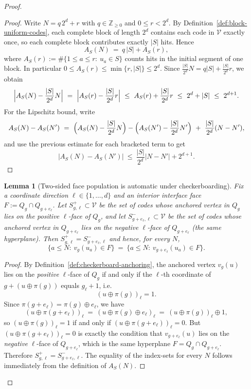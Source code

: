 \documentclass[11pt]{article}
\numberwithin{equation}{section}  %
\theoremstyle{plain}
\newtheorem{lemma}[theorem]{Lemma}
\theoremstyle{definition}
\theoremstyle{remark}
\newcommand{\Z}{\mathbb{Z}}
\begin{document}
\begin{proof}
\begin{proof}
Write $N=q\,2^d+r$ with $q\in\Z_{\ge 0}$ and $0\le r<2^d$.  By Definition~\ref{def:block-uniform-codes}, each complete block of
length $2^d$ contains each code in $\mathcal V$ exactly once, so each complete block contributes exactly $|S|$ hits.  Hence
\[
A_S(N)\ =\ q\,|S| + A_S(r),
\]
where $A_S(r):=\#\{1\le a\le r:\ u_a\in S\}$ counts hits in the initial segment of one block.  In particular
$0\le A_S(r)\le \min\{r,|S|\}\le 2^d$.
Since $\frac{|S|}{2^d}N=q|S|+\frac{|S|}{2^d}r$, we obtain
\[
\Bigl|A_S(N)-\frac{|S|}{2^d}N\Bigr|
\ =\ \Bigl|A_S(r)-\frac{|S|}{2^d}r\Bigr|
\ \le\ A_S(r)+\frac{|S|}{2^d}r
\ \le\ 2^d+|S|
\ \le\ 2^{d+1}.
\]
For the Lipschitz bound, write
\[
A_S(N)-A_S(N')\ =\ \Bigl(A_S(N)-\frac{|S|}{2^d}N\Bigr) - \Bigl(A_S(N')-\frac{|S|}{2^d}N'\Bigr)
\ +\ \frac{|S|}{2^d}(N-N'),
\]
and use the previous estimate for each bracketed term to get
\[
|A_S(N)-A_S(N')|
\ \le\ \frac{|S|}{2^d}|N-N'| + 2^{d+1}.
\]
\end{proof}


\begin{lemma}[Two-sided face population is automatic under checkerboarding]\label{lem:two-sided-face-pop}
Fix a coordinate direction $\ell\in\{1,\dots,d\}$ and an interior interface face $F:=Q_g\cap Q_{g+e_\ell}$.
Let $S_{g,\ell}^+\subset\mathcal V$ be the set of codes whose anchored vertex in $Q_g$ lies on the positive $\ell$-face of $Q_g$, and let
$S_{g+e_\ell,\ell}^-\subset\mathcal V$ be the set of codes whose anchored vertex in $Q_{g+e_\ell}$ lies on the negative $\ell$-face of $Q_{g+e_\ell}$ (the same hyperplane).
Then $S_{g,\ell}^+=S_{g+e_\ell,\ell}^-$ and hence, for every $N$,
\[
\{a\le N:\ v_g(u_a)\in F\}\ =\ \{a\le N:\ v_{g+e_\ell}(u_a)\in F\}.
\]
\end{lemma}

\begin{proof}
By Definition~\ref{def:checkerboard-anchoring}, the anchored vertex $v_g(u)$ lies on the \emph{positive} $\ell$-face of $Q_g$
if and only if the $\ell$-th coordinate of $g+(u\oplus\pi(g))$ equals $g_\ell+1$, i.e.
\[
(u\oplus\pi(g))_\ell=1.
\]
Since $\pi(g+e_\ell)=\pi(g)\oplus e_\ell$, we have
\[
(u\oplus\pi(g+e_\ell))_\ell \ =\ (u\oplus\pi(g)\oplus e_\ell)_\ell \ =\ (u\oplus\pi(g))_\ell\oplus 1,
\]
so $(u\oplus\pi(g))_\ell=1$ if and only if $(u\oplus\pi(g+e_\ell))_\ell=0$.
But $(u\oplus\pi(g+e_\ell))_\ell=0$ is exactly the condition that $v_{g+e_\ell}(u)$ lies on the \emph{negative} $\ell$-face
of $Q_{g+e_\ell}$, which is the same hyperplane $F=Q_g\cap Q_{g+e_\ell}$.  Therefore $S_{g,\ell}^+=S_{g+e_\ell,\ell}^-$.
The equality of the index-sets for every $N$ follows immediately from the definition of $A_S(N)$.
\end{proof}




\end{proof}
\end{document}
